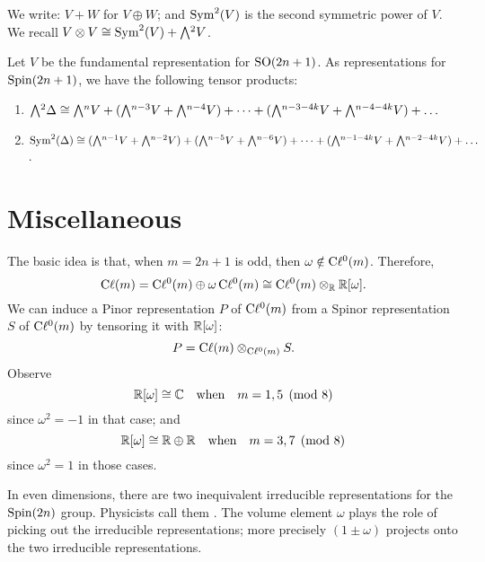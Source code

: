 We write: $V+W$ for $V\oplus W$; and
$\operatorname{Sym}^{2}(V)$ is the second symmetric power of $V$. We recall
$V\otimes V\iso\Sym^{2}(V) + \Exterior^{2}V$.

\begin{theorem}
Let $V$ be the fundamental representation for $\operatorname{SO}(2n+1)$. As
representations for $\operatorname{Spin}(2n+1)$, we have the following tensor products:
\begin{enumerate}
\item $\Exterior^{2}\Delta\iso\Exterior^{n}V + (\Exterior^{n-3}V + \Exterior^{n-4}V) +\dots+(\Exterior^{n-3-4k}V + \Exterior^{n-4-4k}V)+\dots$
\item $\Sym^{2}(\Delta)\iso(\Exterior^{n-1}V + \Exterior^{n-2}V) + (\Exterior^{n-5}V + \Exterior^{n-6}V) + \dots + (\Exterior^{n-1-4k}V + \Exterior^{n-2-4k}V) +\dots$.
\end{enumerate}
\end{theorem}

\section{Miscellaneous}

\M
The basic idea is that, when $m=2n+1$ is odd, then
$\omega\notin\mathrm{C}\ell^{0}(m)$. Therefore,
\begin{equation}
\mathrm{C}\ell(m) = \mathrm{C}\ell^{0}(m) \oplus \omega\,\mathrm{C}\ell^{0}(m)\cong\mathrm{C}\ell^{0}(m)\otimes_{\mathbb{R}}\mathbb{R}[\omega].
\end{equation}
We can induce a Pinor representation $P$ of $\mathrm{C}\ell^{0}(m)$ from a Spinor
representation $S$ of $\mathrm{C}\ell^{0}(m)$ by tensoring it
with $\mathbb{R}[\omega]$:
\begin{equation}
P = \mathrm{C}\ell(m)\otimes_{\mathrm{C}\ell^{0}(m)} S.
\end{equation}
Observe
\begin{equation}
\mathbb{R}[\omega]\cong\mathbb{C}\quad\mbox{when}\quad m=1,5\pmod8
\end{equation}
since $\omega^{2}=-1$ in that case; and
\begin{equation}
\mathbb{R}[\omega]\cong\mathbb{R}\oplus\mathbb{R}\quad\mbox{when}\quad m=3,7\pmod8
\end{equation}
since $\omega^{2}=1$ in those cases.

In even dimensions, there are two inequivalent irreducible
representations for the $\operatorname{Spin}(2n)$ group. Physicists call them
. The volume element $\omega$ plays the role of
picking out the irreducible representations; more precisely
$(1\pm\omega)$ projects onto the two irreducible representations.

